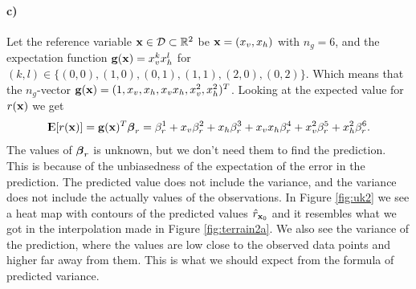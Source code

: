 \paragraph{c)}
Let the reference variable $\boldsymbol{\mathbf{x}} \in \mathcal{D} \subset \mathbb{R}^2$ be $\boldsymbol{\mathbf{x}} = (x_v, x_h)$ with $n_g = 6$, and the expectation function $\boldsymbol{\mathbf{g}}(\boldsymbol{\mathbf{x}}) = x_v^kx_h^l$ for $(k,l) \in \{(0,0),(1,0),(0,1),(1,1),(2,0),(0,2)\}$. Which means that the $n_g$-vector $\boldsymbol{\mathbf{g}}(\boldsymbol{\mathbf{x}}) = (1,x_v,x_h,x_vx_h,x_v^2,x_h^2)^T$. Looking at the expected value for $r(\boldsymbol{\mathbf{x}})$ we get
\begin{equation*}
    {\rm I\kern-.3em E}[r(\boldsymbol{\mathbf{x}})] = \boldsymbol{\mathbf{g}}(\boldsymbol{\mathbf{x}})^T \boldsymbol{\mathbf{\beta}}_r = \beta_r^1 + x_v \beta_r^2 + x_h \beta_r^3 + x_v x_h \beta_r^4 + x_v^2 \beta_r^5 + x_h^2 \beta_r^6.
\end{equation*}
The values of $\boldsymbol{\mathbf{\beta}}_r$ is unknown, but we don't need them to find the prediction. This is because of the unbiasedness of the expectation of the error in the prediction. 
The predicted value does not include the variance, and the variance does not include the actually values of the observations. 
In Figure \ref{fig:uk2} we see a heat map with contours of the predicted values $\hat{r}_{\boldsymbol{\mathbf{x}}_0}$ and it resembles what we got in the interpolation made in Figure \ref{fig:terrain2a}. We also see the variance of the prediction, where the values are low close to the observed data points and higher far away from them. This is what we should expect from the formula of predicted variance.
